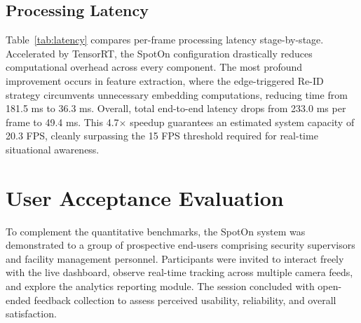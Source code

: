 \subsection{Processing Latency}
\label{subsec:latency-results}

Table~\ref{tab:latency} compares per-frame processing latency stage-by-stage. Accelerated by TensorRT, the SpotOn configuration drastically reduces computational overhead across every component. The most profound improvement occurs in feature extraction, where the edge-triggered Re-ID strategy circumvents unnecessary embedding computations, reducing time from 181.5 ms to 36.3 ms. Overall, total end-to-end latency drops from 233.0 ms per frame to 49.4 ms. This 4.7$\times$ speedup guarantees an estimated system capacity of 20.3 FPS, cleanly surpassing the 15 FPS threshold required for real-time situational awareness.

\begin{table}[H]
\caption{Per-Frame Processing Latency: Baseline vs.\ Optimized}
\label{tab:latency}
\centering
\renewcommand{\arraystretch}{1.15}
\end{table}

\section{User Acceptance Evaluation}
\label{section:user-acceptance}

To complement the quantitative benchmarks, the SpotOn system was demonstrated to a group of prospective end-users comprising security supervisors and facility management personnel. Participants were invited to interact freely with the live dashboard, observe real-time tracking across multiple camera feeds, and explore the analytics reporting module. The session concluded with open-ended feedback collection to assess perceived usability, reliability, and overall satisfaction.

